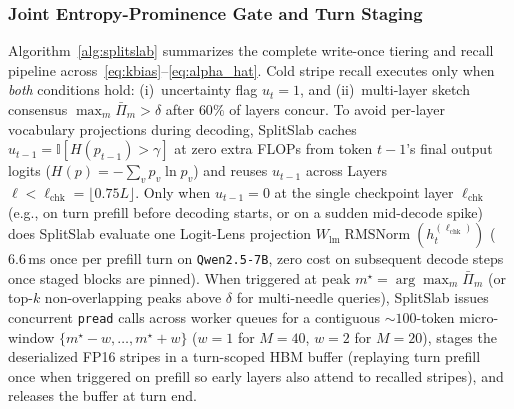 \documentclass[10pt,journal,compsoc]{IEEEtran}
\theoremstyle{definition}
\theoremstyle{remark}
\newcounter{alg}
\newcommand{\SplitSlab}{\textup{\textsc{SplitSlab}}}
\newcommand{\RMSNorm}{\operatorname{RMSNorm}}
\def\SplitSlab{SplitSlab}%
\begin{document}
\subsubsection{Joint Entropy-Prominence Gate and Turn Staging}
Algorithm~\ref{alg:splitslab} summarizes the complete write-once tiering and recall pipeline across~\eqref{eq:kbias}--\eqref{eq:alpha_hat}. Cold stripe recall executes only when \emph{both} conditions hold: (i)~uncertainty flag $u_t = 1$, and (ii)~multi-layer sketch consensus $\max_m \bar{\Pi}_m > \delta$ after $60\%$ of layers concur. To avoid per-layer vocabulary projections during decoding, \SplitSlab{} caches $u_{t-1} = \mathbb{I}[H(p_{t-1}) > \gamma]$ at zero extra FLOPs from token $t-1$'s final output logits ($H(p) = -\sum_v p_v\ln p_v$) and reuses $u_{t-1}$ across Layers $\ell < \ell_{\mathrm{chk}} = \lfloor 0.75 L \rfloor$. Only when $u_{t-1} = 0$ at the single checkpoint layer $\ell_{\mathrm{chk}}$ (e.g., on turn prefill before decoding starts, or on a sudden mid-decode spike) does \SplitSlab{} evaluate one Logit-Lens projection $W_{\mathrm{lm}}\RMSNorm(h_t^{(\ell_{\mathrm{chk}})})$ ($6.6$\,ms once per prefill turn on \texttt{Qwen2.5-7B}, zero cost on subsequent decode steps once staged blocks are pinned). When triggered at peak $m^\star = \arg\max_m \bar{\Pi}_m$ (or top-$k$ non-overlapping peaks above $\delta$ for multi-needle queries), \SplitSlab{} issues concurrent \texttt{pread} calls across worker queues for a contiguous $\sim\!100$-token micro-window $\{m^\star - w,\dots,m^\star + w\}$ ($w = 1$ for $M=40$, $w=2$ for $M=20$), stages the deserialized FP16 stripes in a turn-scoped HBM buffer (replaying turn prefill once when triggered on prefill so early layers also attend to recalled stripes), and releases the buffer at turn end.
\end{document}
